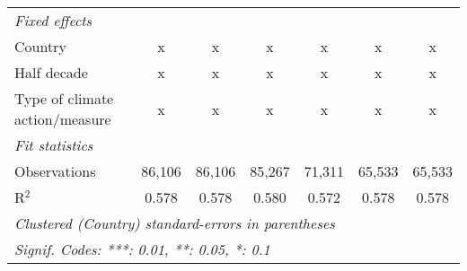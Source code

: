 \begin{tabular}{lcccccc}
   \emph{Fixed effects}\\
   Country                                           & x           & x            & x            & x       & x       & x\\  
   Half decade                                       & x           & x            & x            & x       & x       & x\\  
   Type of climate action/measure                    & x           & x            & x            & x       & x       & x\\  
   \midrule \emph{Fit statistics}\\
   Observations                                      & 86,106      & 86,106       & 85,267       & 71,311  & 65,533  & 65,533\\  
   R$^2$                                             & 0.578       & 0.578        & 0.580        & 0.572   & 0.578   & 0.578\\  
   \midrule
   \multicolumn{7}{l}{\emph{Clustered (Country) standard-errors in parentheses}}\\
   \multicolumn{7}{l}{\emph{Signif. Codes: ***: 0.01, **: 0.05, *: 0.1}}\\
\end{tabular}
\par\endgroup


